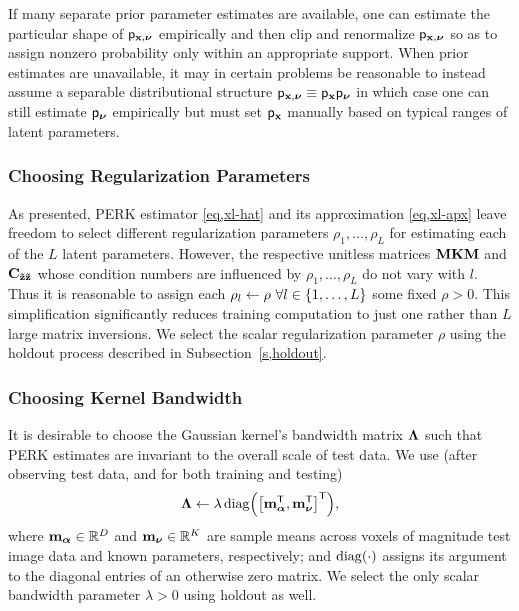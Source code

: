 If many separate prior parameter estimates are available,
one can estimate the particular shape 
of $\mathsf{p}_{\mathbf{x},\boldsymbol{\nu}}$ empirically 
and then clip and renormalize $\mathsf{p}_{\mathbf{x},\boldsymbol{\nu}}$
so as to assign nonzero probability
only within an appropriate support.
When prior estimates are unavailable,
it may in certain problems be reasonable 
to instead assume
a separable distributional structure
$\mathsf{p}_{\mathbf{x},\boldsymbol{\nu}} \equiv \mathsf{p}_{\mathbf{x}}\mathsf{p}_{\boldsymbol{\nu}}$
in which case
one can still estimate $\mathsf{p}_{\boldsymbol{\nu}}$ empirically
but must set $\mathsf{p}_{\mathbf{x}}$ manually
based on typical ranges
of latent parameters.

\subsubsection{Choosing Regularization Parameters}
\label{sss,perk,pract,mod,reg}

As presented,
PERK estimator \eqref{eq,xl-hat}
and its approximation \eqref{eq,xl-apx}
leave freedom to select different regularization parameters
$\rho_1,\dots,\rho_L$
for estimating each of the $L$ latent parameters.
However,
the respective unitless matrices 
$\mathbf{M}\mathbf{K}\mathbf{M}$ and $\mathbf{C_{\tilde{\mathbf{z}}\tilde{\mathbf{z}}}}$ 
whose condition numbers are influenced 
by $\rho_1,\dots,\rho_L$
do not vary with $l$.
Thus it is reasonable 
to assign each $\rho_l \gets \rho\,\, \forall l \in \set{1,\dots,L}$ 
some fixed $\rho > 0$.
This simplification significantly reduces training computation
to just one
rather than $L$
large matrix inversions.
We select the scalar regularization parameter $\rho$
using the holdout process 
described in Subsection~\ref{s,holdout}.

\subsubsection{Choosing Kernel Bandwidth}
\label{sss,perk,pract,mod,length}

It is desirable 
to choose the Gaussian kernel's bandwidth matrix $\boldsymbol{\Lambda}$ 
such that PERK estimates are invariant 
to the overall scale of test data. 
We use
(after observing test data,
and for both training and testing)
\begin{align}
	\bmL \gets \lambda \diag{\brac{\bmmybar\tpose, \bmmnu\tpose}\tpose},
	\label{eq,bw}
\end{align}
where 
$\mathbf{m}_{\boldsymbol{\alpha}} \in \mathbb{R}^{D}$ 
and 
$\mathbf{m}_{\boldsymbol{\nu}} \in \mathbb{R}^{K}$
are sample means across voxels
of magnitude test image data
and known parameters,
respectively;
and $\diag{\cdot}$ assigns its argument 
to the diagonal entries
of an otherwise zero matrix.
We select the
only scalar bandwidth parameter $\lambda>0$
using holdout as well.

